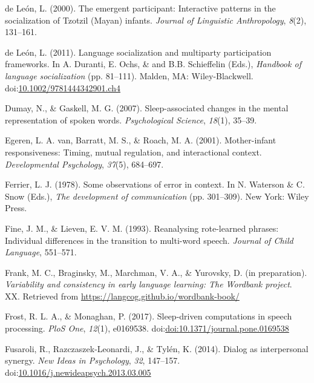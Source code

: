 \documentclass[floatsintext,man]{apa6}
\theoremstyle{definition}
\theoremstyle{definition}
\theoremstyle{definition}
\theoremstyle{remark}
\begin{document}
\hypertarget{ref-deleon2000emergent}{}
de León, L. (2000). The emergent participant: Interactive patterns in
the socialization of Tzotzil (Mayan) infants. \emph{Journal of
Linguistic Anthropology}, \emph{8}(2), 131--161.

\hypertarget{ref-deleon2011language}{}
de León, L. (2011). Language socialization and multiparty participation
frameworks. In A. Duranti, E. Ochs, \& and B.B. Schieffelin (Eds.),
\emph{Handbook of language socialization} (pp. 81--111). Malden, MA:
Wiley-Blackwell.
doi:\href{https://doi.org/10.1002/9781444342901.ch4}{10.1002/9781444342901.ch4}

\hypertarget{ref-dumay2007sleep}{}
Dumay, N., \& Gaskell, M. G. (2007). Sleep-associated changes in the
mental representation of spoken words. \emph{Psychological Science},
\emph{18}(1), 35--39.

\hypertarget{ref-vanegeren2001mother}{}
Egeren, L. A. van, Barratt, M. S., \& Roach, M. A. (2001). Mother-infant
responsiveness: Timing, mutual regulation, and interactional context.
\emph{Developmental Psychology}, \emph{37}(5), 684--697.

\hypertarget{ref-ferrier1978some}{}
Ferrier, L. J. (1978). Some observations of error in context. In N.
Waterson \& C. Snow (Eds.), \emph{The development of communication} (pp.
301--309). New York: Wiley Press.

\hypertarget{ref-pine1993reanalysing}{}
Fine, J. M., \& Lieven, E. V. M. (1993). Reanalysing rote-learned
phrases: Individual differences in the transition to multi-word speech.
\emph{Journal of Child Language}, 551--571.

\hypertarget{ref-frankIPvariability}{}
Frank, M. C., Braginsky, M., Marchman, V. A., \& Yurovsky, D. (in
preparation). \emph{Variability and consistency in early language
learning: The Wordbank project}. XX. Retrieved from
\url{https://langcog.github.io/wordbank-book/}

\hypertarget{ref-frost2017sleep}{}
Frost, R. L. A., \& Monaghan, P. (2017). Sleep-driven computations in
speech processing. \emph{PloS One}, \emph{12}(1), e0169538.
doi:\href{https://doi.org/doi:10.1371/journal.pone.0169538}{doi:10.1371/journal.pone.0169538}

\hypertarget{ref-fusaroli2014synergy}{}
Fusaroli, R., Razczaszek-Leonardi, J., \& Tylén, K. (2014). Dialog as
interpersonal synergy. \emph{New Ideas in Psychology}, \emph{32},
147--157.
doi:\href{https://doi.org/10.1016/j.newideapsych.2013.03.005}{10.1016/j.newideapsych.2013.03.005}
\end{document}
